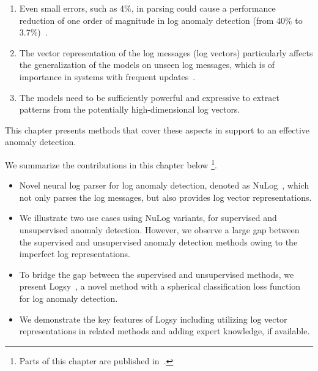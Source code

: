 \begin{enumerate}
    \item Even small errors, such as 4\%, in parsing could cause a performance reduction of one order of magnitude in log anomaly detection (from 40\% to 3.7\%)~\cite{he2016evaluation}.
    \item The vector representation of the log messages (log vectors) particularly affects the generalization of the models on unseen log messages, which is of importance in systems with frequent updates~\cite{zhang2019robust,meng2019loganomaly}.
    \item The models need to be sufficiently powerful and expressive to extract patterns from the potentially high-dimensional log vectors. 
\end{enumerate}

This chapter presents methods that cover these aspects in support to an effective anomaly detection.


We summarize the contributions in this chapter below \footnote{Parts of this chapter are published in~\cite{nedelkoski2020loganomaly,nedelkoski2020selfsupervised,nedelkoski2020data,nedelkoski2020bigdatatransfer}.}.
\begin{itemize}
    \item Novel neural log parser for log anomaly detection, denoted as NuLog~\cite{nedelkoski2020selfsupervised}, which not only parses the log messages, but also provides log vector representations.
    \item We illustrate two use cases using NuLog variants, for supervised and unsupervised anomaly detection. However, we observe a large gap between the supervised and unsupervised anomaly detection methods owing to the imperfect log representations.
    \item To bridge the gap between the supervised and unsupervised methods, we present Logsy~\cite{nedelkoski2020loganomaly}, a novel method with a spherical classification loss function for log anomaly detection.
    \item We demonstrate the key features of Logsy including utilizing log vector representations in related methods and adding expert knowledge, if available.
\end{itemize}

